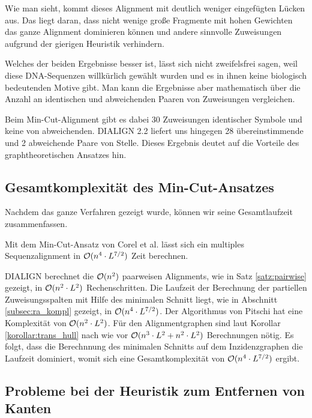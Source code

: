 Wie man sieht, kommt dieses Alignment mit deutlich weniger eingefügten Lücken aus. Das liegt daran, dass nicht wenige große Fragmente mit hohen Gewichten das ganze Alignment dominieren können und andere sinnvolle Zuweisungen aufgrund der gierigen Heuristik verhindern.

Welches der beiden Ergebnisse besser ist, lässt sich nicht zweifelsfrei sagen, weil diese DNA-Sequenzen willkürlich gewählt wurden und es in ihnen keine biologisch bedeutenden Motive gibt. Man kann die Ergebnisse aber mathematisch über die Anzahl an identischen und abweichenden Paaren von Zuweisungen vergleichen.

Beim Min-Cut-Alignment gibt es dabei 30 Zuweisungen identischer Symbole und keine von abweichenden. DIALIGN 2.2 liefert uns hingegen 28 übereinstimmende und 2 abweichende Paare von Stelle. Dieses Ergebnis deutet auf die Vorteile des graphtheoretischen Ansatzes hin. 
 
\subsection{Gesamtkomplexität des Min-Cut-Ansatzes}

Nachdem das ganze Verfahren gezeigt wurde, können wir seine Gesamtlaufzeit zusammenfassen.

\begin{korollar}\label{korollar:min-cut}
	Mit dem Min-Cut-Ansatz von Corel et al. lässt sich ein multiples Sequenzalignment in $\mathcal{O}(n^4\cdot L^{7/2})$ Zeit berechnen.
\end{korollar}

\begin{beweis}
	DIALIGN berechnet die $\mathcal{O}(n^2)$ paarweisen Alignments, wie in Satz \ref{satz:pairwise} gezeigt, in $\mathcal{O}(n^2\cdot L^2)$ Rechenschritten. Die Laufzeit der Berechnung der partiellen Zuweisungsspalten mit Hilfe des minimalen Schnitt liegt, wie in Abschnitt \ref{subsec:ra_kompl} gezeigt, in $\mathcal{O}(n^4\cdot L^{7/2})$. Der Algorithmus von Pitschi hat eine Komplexität von $\mathcal{O}(n^2\cdot L^2)$. Für den Alignmentgraphen sind laut Korollar \ref{korollar:trans_hull} nach wie vor $\mathcal{O}(n^3\cdot L^2 + n^2\cdot L^2)$ Berechnungen nötig. Es folgt, dass die Berechnnung des minimalen Schnitts auf dem Inzidenzgraphen die Laufzeit dominiert, womit sich eine Gesamtkomplexität von $\mathcal{O}(n^4\cdot L^{7/2})$ ergibt.
\end{beweis}

\subsection{Probleme bei der Heuristik zum Entfernen von Kanten}

